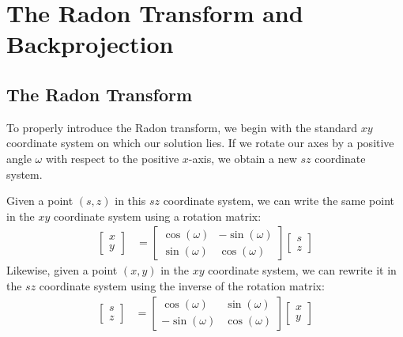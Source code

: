 
\section{The Radon Transform and Backprojection}

\subsection{The Radon Transform}

To properly introduce the Radon transform, we begin with the standard $xy$ coordinate system on which our solution lies.
If we rotate our axes by a positive angle $\omega$ with respect to the positive $x$-axis, we obtain a new $sz$ coordinate system.
\par 
Given a point $\left( s, z \right)$ in this $sz$ coordinate system, we can write the same point in the $xy$ coordinate system using a rotation matrix:
\begin{align*}
    \begin{bmatrix}
        x \\
        y
    \end{bmatrix}
    & = 
    \begin{bmatrix}
        \cos (\omega) & -\sin (\omega) \\
        \sin (\omega) & \cos (\omega)
    \end{bmatrix}
    \begin{bmatrix}
        s \\
        z
    \end{bmatrix}
\end{align*}
Likewise, given a point $\left( x, y \right)$ in the $xy$ coordinate system, we can rewrite it in the $sz$ coordinate system using the inverse of the rotation matrix:
\begin{align*}
    \begin{bmatrix}
        s \\
        z
    \end{bmatrix}
    & = 
    \begin{bmatrix}
        \cos (\omega) & \sin (\omega) \\
         -\sin (\omega) & \cos (\omega)
    \end{bmatrix}
    \begin{bmatrix}
        x \\
        y
    \end{bmatrix}
\end{align*}
